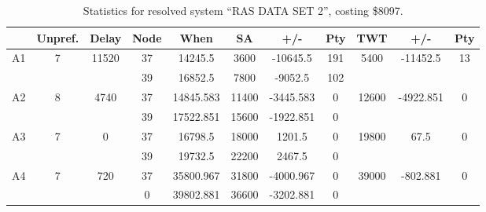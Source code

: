 \begin{sidewaystable}
\footnotesize
\caption{Statistics for resolved system ``RAS DATA SET 2'', costing \$8097.}
\centering
\begin{tabular}{c||c|c||c|c|c|c|c||c|c|c}
  \hline \hline
  &
  Unpref. & 
  Delay &
  Node &
  When &
  SA &
  +/- &
  Pty &
  TWT &
  +/- &
  Pty \\
      \hline
      \multirow{2}{*}{A1} &
      \multirow{2}{*}{7} &
      \multirow{2}{*}{11520} &
      37 &
      14245.5 &
      3600 &
        -10645.5 &
        191 &
      \multirow{2}{*}{5400} &
        \multirow{2}{*}{-11452.5} &
        \multirow{2}{*}{13}
      \\
      \cline{4-8}
       &
       &
       &
      39 &
      16852.5 &
      7800 &
        -9052.5 &
        102 &
      
         &
        
      \\
      \hline
      \multirow{2}{*}{A2} &
      \multirow{2}{*}{8} &
      \multirow{2}{*}{4740} &
      37 &
      14845.583 &
      11400 &
        -3445.583 &
        0 &
      \multirow{2}{*}{12600} &
        \multirow{2}{*}{-4922.851} &
        \multirow{2}{*}{0}
      \\
      \cline{4-8}
       &
       &
       &
      39 &
      17522.851 &
      15600 &
        -1922.851 &
        0 &
      
         &
        
      \\
      \hline
      \multirow{2}{*}{A3} &
      \multirow{2}{*}{7} &
      \multirow{2}{*}{0} &
      37 &
      16798.5 &
      18000 &
        1201.5 &
        0 &
      \multirow{2}{*}{19800} &
        \multirow{2}{*}{67.5} &
        \multirow{2}{*}{0}
      \\
      \cline{4-8}
       &
       &
       &
      39 &
      19732.5 &
      22200 &
        2467.5 &
        0 &
      
         &
        
      \\
      \hline
      \multirow{2}{*}{A4} &
      \multirow{2}{*}{7} &
      \multirow{2}{*}{720} &
      37 &
      35800.967 &
      31800 &
        -4000.967 &
        0 &
      \multirow{2}{*}{39000} &
        \multirow{2}{*}{-802.881} &
        \multirow{2}{*}{0}
      \\
      \cline{4-8}
       &
       &
       &
      0 &
      39802.881 &
      36600 &
        -3202.881 &
        0 &
      

\end{tabular}
\end{sidewaystable}

